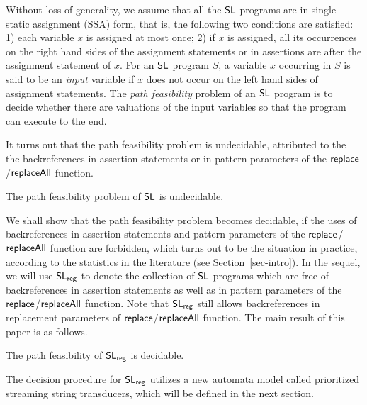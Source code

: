Without loss of generality, we assume that all the $\mathsf{SL}$ programs are in single static assignment (SSA) form, that is, the following two conditions are satisfied: 1) each variable $x$ is assigned at most once; 2) if $x$ is assigned, all its occurrences on the right hand sides of the assignment statements or in assertions are after the assignment statement of $x$.
%
For an $\mathsf{SL}$ program $S$, a variable $x$ occurring in $S$ is said to be an \emph{input} variable if $x$ does not occur on the left hand sides of assignment statements. The \emph{path feasibility} problem of an $\mathsf{SL}$ program is to decide whether there are valuations of the input variables so that the program can execute to the end.


%





It turns out that the path feasibility problem is undecidable, attributed to the the backreferences in assertion statements or in pattern parameters of the $\mathsf{replace}$/$\mathsf{replaceAll}$ function. 

\begin{proposition}\label{prop-und}
The path feasibility problem of $\mathsf{SL}$ is undecidable.
\end{proposition}

We shall show that the path feasibility problem becomes decidable, if the uses of backreferences in assertion statements and pattern parameters of the $\mathsf{replace}$/$\mathsf{replaceAll}$ function are forbidden, which turns out to be the situation in practice,  according to the statistics in the literature (see Section~\ref{sec-intro}).
In the sequel, we will use $\mathsf{SL}_{\sf reg}$ to denote the collection of $\mathsf{SL}$ programs which are free of %
backreferences in assertion statements as well as in pattern parameters of the $\mathsf{replace}$/$\mathsf{replaceAll}$ function. %
Note that $\mathsf{SL}_{\sf reg}$  still allows backreferences in replacement parameters of $\mathsf{replace}$/$\mathsf{replaceAll}$ function. The main result of this paper is as follows.

\begin{theorem}\label{thm-main}
The path feasibility of $\mathsf{SL}_{\sf reg}$ is decidable.
\end{theorem}
The decision procedure for $\mathsf{SL}_{\sf reg}$ utilizes a new automata model called prioritized streaming string transducers, which will be defined in the next section.
